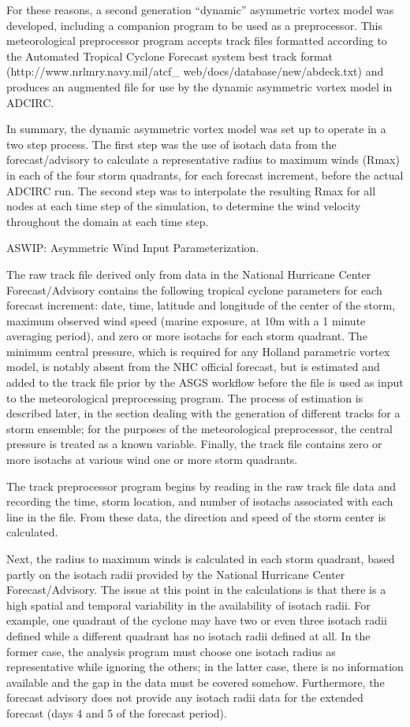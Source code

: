 \documentclass[12pt]{article}
\begin{document}
For these reasons, a second generation ``dynamic'' asymmetric vortex 
model was developed, including a companion program to be used as a 
preprocessor. This meteorological preprocessor program accepts track 
files formatted according to the Automated Tropical Cyclone Forecast 
system best track format (http://www.nrlmry.navy.mil/atcf\_ 
web/docs/database/new/abdeck.txt) and produces an augmented file for 
use by the dynamic asymmetric vortex model in ADCIRC. 

In summary, the dynamic asymmetric vortex model was set up to 
operate in a two step process. The first step was the use of isotach 
data from the forecast/advisory to calculate a representative radius 
to maximum winds (Rmax) in each of the four storm quadrants, for 
each forecast increment, before the actual ADCIRC run. The second 
step was to interpolate the resulting Rmax for all nodes at each 
time step of the simulation, to determine the wind velocity 
throughout the domain at each time step.

ASWIP: Asymmetric Wind Input Parameterization.

The raw track file derived only from data in the National Hurricane 
Center Forecast/Advisory contains the following tropical cyclone 
parameters for each forecast increment: date, time, latitude and 
longitude of the center of the storm, maximum observed wind speed 
(marine exposure, at 10m with a 1 minute averaging period), and zero 
or more isotachs for each storm quadrant. The minimum central 
pressure, which is required for any Holland parametric vortex model, 
is notably absent from the NHC official forecast, but is estimated 
and added to the track file prior by the ASGS workflow before the 
file is used as input to the meteorological preprocessing program. 
The process of estimation is described later, in the section dealing 
with the generation of different tracks for a storm ensemble; for 
the purposes of the meteorological preprocessor, the central 
pressure is treated as a known variable. Finally, the track file 
contains zero or more isotachs at various wind one or more storm 
quadrants.

The track preprocessor program begins by reading in the raw track file
data and recording the time, storm location, and number of isotachs
associated with each line in the file. From these data, the direction
and speed of the storm center is calculated.

Next, the radius to maximum winds is calculated in each storm 
quadrant, based partly on the isotach radii provided by the National 
Hurricane Center Forecast/Advisory. The issue at this point in the 
calculations is that there is a high spatial and temporal 
variability in the availability of isotach radii. For example, one 
quadrant of the cyclone may have two or even three isotach radii 
defined while a different quadrant has no isotach radii defined at 
all. In the former case, the analysis program must choose one 
isotach radius as representative while ignoring the others; in the 
latter case, there is no information available and the gap in the 
data must be covered somehow. Furthermore, the forecast advisory
does not provide any isotach radii data for the extended forecast
(days 4 and 5 of the forecast period).
\end{document}
